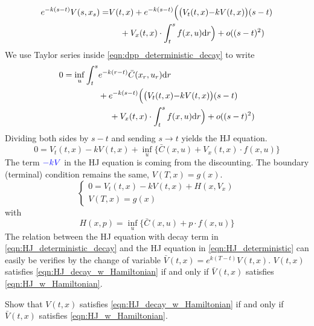 \documentclass[11pt]{book}
\newcommand{\dr}{\text{\normalfont d}r}
\begin{document}
    \[
        \begin{split}
             {e^{-k(s-t)}}V(s,x_s) = &V(t,x) + {e^{-k(s-t)}}\Big(\big(V_t(t,x) {- k V(t,x)}\big)(s-t)\\
             &~~~~+ V_x(t,x)\cdot\int_t^s f(x,u)\dr\Big) + o((s-t)^2)
        \end{split}
        \]
       We use Taylor series inside \eqref{eqn:dpp_deterministic_decay} to write
        \[
        \begin{split}
            0=\inf_{u}\int_t^s &{e^{-k(r-t)}}\bar{C}(x_r,u_r)\dr \\
            &+  {e^{-k(s-t)}}\Big(\big(V_t(t,x) {- k V(t,x)}\big)(s-t)\\
             &~~~~+ V_x(t,x)\cdot\int_t^s f(x,u)\dr\Big) + o((s-t)^2)
        \end{split}
        \]
        Dividing both sides by $s-t$ and sending $s\to t$ yields the HJ equation.
        \begin{equation}
            \label{eqn:HJ_deterministic_decay}
            0=V_t(t,x) - k V(t,x)+\inf_{u}\Big\{\bar{C}(x,u) + V_x(t,x)\cdot f(x,u)\Big\}
        \end{equation}
        The term ${\color{blue}-kV}$ in the HJ equation is coming from the discounting. 
        The boundary (terminal) condition remains the same, $V(T,x)=g(x)$. 
        \begin{equation}
        \label{eqn:HJ_decay_w_Hamiltonian}
            \begin{cases}
                0=V_t(t,x) - k V(t,x)+H(x,V_x)\\
                V(T,x)=g(x)
            \end{cases}
        \end{equation}
        with
        \[
        H(x,p)=\inf_{u}\Big\{\bar{C}(x,u) + p\cdot f(x,u)\Big\}
        \]
        The relation between the HJ equation with decay term in \eqref{eqn:HJ_deterministic_decay} and the HJ equation in \eqref{eqn:HJ_deterministic} can easily be verifies by the change of variable $\bar{V}(t,x)=e^{k(T-t)}V(t,x)$. $V(t,x)$ satisfies \eqref{eqn:HJ_decay_w_Hamiltonian} if and only if $\bar{V}(t,x)$ satisfies \eqref{eqn:HJ_w_Hamiltonian}. 
        \begin{ex}
            Show that $V(t,x)$ satisfies \eqref{eqn:HJ_decay_w_Hamiltonian} if and only if $\bar{V}(t,x)$ satisfies \eqref{eqn:HJ_w_Hamiltonian}. 
        \end{ex}
    
\end{document}
